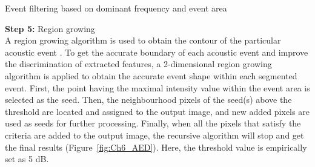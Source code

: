 \begin{algorithm}
\DontPrintSemicolon
{}

\caption{Event filtering based on dominant frequency and event area}
\end{algorithm}

\noindent \textbf{Step 5:} Region growing
\\
A region growing algorithm is used to obtain the contour of the particular acoustic event \citep{mallawaarachchi2008spectrogram}. To get the accurate boundary of each acoustic event and improve the discrimination of extracted features, a 2-dimensional region growing algorithm is applied to obtain the accurate event shape within each segmented event. First, the point having the maximal intensity value within the event area is selected as the seed. Then, the neighbourhood pixels of the seed(s) above the threshold are located and assigned to the output image, and new added pixels are used as seeds for further processing. Finally, when all the pixels that satisfy the criteria are added to the output image, the recursive algorithm will stop and get the final results (Figure~\ref{fig:Ch6_AED}). Here, the threshold value is empirically set as 5 dB.

